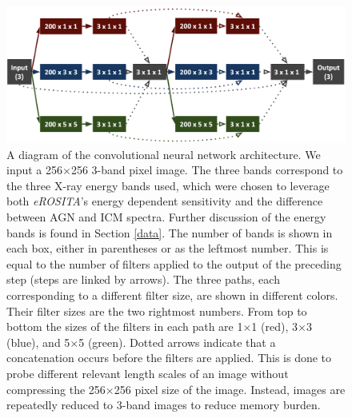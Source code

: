 \documentclass[twocolumn, 11pt]{aastex63}%
\begin{document}
\begin{figure}
    \centering
    \includegraphics[width=.86\linewidth]{1skip.png}
    \caption{A diagram of the convolutional neural network architecture. We input a 256$\times$256 3-band pixel image. The three bands correspond to the three X-ray energy bands used, which were chosen to leverage both \textit{eROSITA}'s energy dependent sensitivity and the difference between AGN and ICM spectra. Further discussion of the energy bands is found in Section \ref{data}. The number of bands is shown in each box, either in parentheses or as the leftmost number. This is equal to the number of filters applied to the output of the preceding step (steps are linked by arrows). The three paths, each corresponding to a different filter size, are shown in different colors. Their filter sizes are the two rightmost numbers. From top to bottom the sizes of the filters in each path are 1$\times$1 (red), 3$\times$3 (blue), and 5$\times$5 (green). Dotted arrows indicate that a concatenation occurs before the filters are applied. This is done to probe different relevant length scales of an image without compressing the 256$\times$256 pixel size of the image. Instead, images are repeatedly reduced to 3-band images to reduce memory burden.}
\label{fig:Algorithm}
\end{figure}
\end{document}
